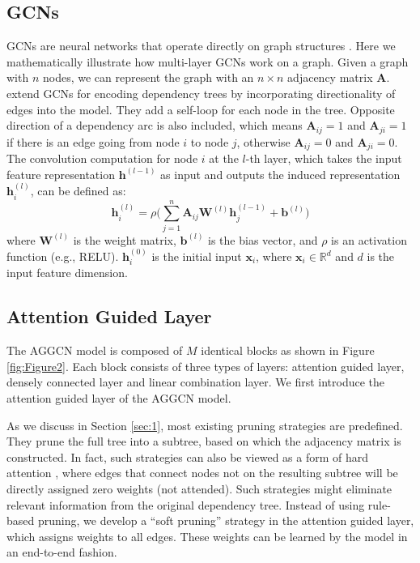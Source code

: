 \documentclass[11pt,a4paper]{article}
\begin{document}
\subsection{GCNs}
\label{ssec:2.1}

GCNs are neural networks that operate directly on graph structures \citep{Kipf2016SemiSupervisedCW}.  Here we mathematically illustrate how multi-layer GCNs work on a graph. Given a graph with $n$ nodes, we can represent the graph with an $n \times n$ adjacency matrix $\mathbf{A}$. \citet{Marcheggiani2017EncodingSW} extend GCNs for encoding dependency trees by incorporating directionality of edges into the model. They add a self-loop for each node in the tree. Opposite direction of a dependency arc is also included, which means $\mathbf{A}_{ij}=1$ and $\mathbf{A}_{ji}=1$ if there is an edge going from node $i$ to node $j$, otherwise $\mathbf{A}_{ij}=0$ and $\mathbf{A}_{ji}=0$. The convolution computation for node $i$ at the $l$-th layer, which takes the input feature representation $\mathbf{h}^{(l-1)}$ as input and outputs the induced representation $\mathbf{h}_i^{(l)}$, can be defined as:
\begin{equation}
\mathbf{h}_{i}^{(l)} = \rho \Big(\sum_{j=1}^{n} \mathbf{A}_{ij} \mathbf{W}^{(l)} \mathbf{h}_{j}^{(l-1)} + \mathbf{b}^{(l)} \Big)
\end{equation}
where $\mathbf{W}^{(l)}$ is the weight matrix, $\mathbf{b}^{(l)}$ is the bias vector,  and $\rho$ is an activation function (e.g., RELU). $\mathbf{h}^{(0)}_i$ is the initial input $\mathbf{x}_i$, where $\mathbf{x}_i \in \mathbb{R}^{d}$ and $d$ is the input feature dimension. 


\subsection{Attention Guided Layer}
\label{ssec:2.2}
The AGGCN model is composed of $M$ identical blocks as shown in Figure \ref{fig:Figure2}. Each block consists of three types of layers: attention guided layer, densely connected layer and linear combination layer. We first introduce the attention guided layer of the AGGCN model.



As we discuss in Section \ref{sec:1}, most existing pruning strategies are predefined. They prune the full tree into a subtree, based on which the adjacency matrix is constructed. In fact, such strategies can also be viewed as a form of hard attention \citep{Xu2015ShowAA}, where edges that connect nodes not on the resulting subtree will be directly assigned zero weights (not attended). Such strategies might eliminate relevant information from the original dependency tree. Instead of using rule-based pruning, we develop a ``soft pruning'' strategy in the attention guided layer, which assigns weights to all edges. These weights can be learned by the model in an end-to-end fashion.
\end{document}
